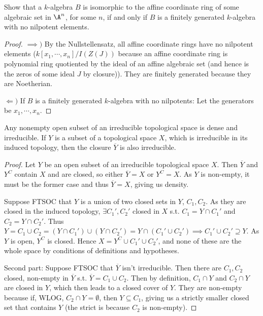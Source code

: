 \begin{exercise}%
Show that a $k $-algebra $B $ is isomorphic to the affine coordinate ring of some algebraic set in $\A^n$, for some $n $, if and only if $B $ is a finitely generated $k $-algebra with no nilpotent elements.
\end{exercise}
\begin{proof}
	$\implies) $ By the Nullstellensatz, all affine coordinate rings have no nilpotent elements ($k[x_{1},\cdots,x_n] / I(Z(J)) $ because an affine coordinate ring is polynomial ring quotiented by the ideal of an affine algebraic set (and hence is the zeros of some ideal $J $ by closure)).
	They are finitely generated because they are Noetherian.

	$\Leftarrow) $ If $B $ is a finitely generated $k $-algebra with no nilpotents: 
	Let the generators be $x_{1},\cdots, x_n $.
\end{proof}

\begin{exercise}%
Any nonempty open subset of an irreducible topological space is dense and irreducible. If $Y $ is a subset of a topological space $X $, which is irreducible in its induced topology, then the closure $\overline{Y}  $ is also irreducible.
\end{exercise}
\begin{proof}
	Let $Y $ be an open subset of an irreducible topological space $X $.
	Then $\overline{Y}  $ and $Y^C $ contain $X $ and are closed, so either $\overline{Y} = X  $ or $Y^C = X $.
	As $Y $ is non-empty, it must be the former case and thus $\overline{Y} = X  $, giving us density.

	Suppose FTSOC that $Y $ is a union of two closed sets in $Y $, $C_{1},C_{2} $.
	As they are closed in the induced topology, $\exists C_{1}',C_{2}' $ closed in $X $ s.t. $C_{1} = Y \cap C_{1}' $ and $C_{2} = Y\cap C_{2}' $.
	Thus $Y = C_{1} \cup C_{2} = (Y\cap C_{1}') \cup (Y \cap C_{2}') = Y \cap (C_{1}'\cup C_{2}') \implies C_{1}'\cup C_{2}' \supseteq Y$.
	As $Y $ is open, $Y^C $ is closed.
	Hence $X = Y^C \cup C_{1}'\cup C_{2}' $, and none of these are the whole space by conditions of definitions and hypotheses.

	Second part:
	Suppose FTSOC that $\overline{Y}  $ isn't irreducible.
	Then there are $C_{1},C_{2} $ closed, non-empty in $\overline{Y}  $ s.t. $\overline{Y} = C_{1}\cup C_{2} $.
	Then by definition, $C_{1}\cap Y $ and $C_{2}\cap Y $ are closed in $Y $, which then leads to a closed cover of $Y $.
	They are non-empty because if, WLOG, $C_{2}\cap Y = \emptyset $, then $Y\subseteq C_{1} $, giving us a strictly smaller closed set that contains $Y $ (the strict is because $C_{2} $ is non-empty).
\end{proof}

